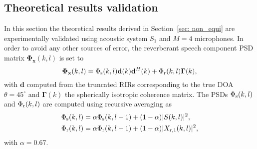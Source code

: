 \documentclass[10pt]{IEEEtran}
\begin{document}
\subsection{Theoretical results validation}
\label{sec: theo_validation}
In this section the theoretical results derived in Section~\ref{sec: non_equi} are experimentally validated using acoustic system $S_1$ and $M = 4$ microphones.
In order to avoid any other sources of error, the reverberant speech component PSD matrix $\mathbf{\Phi}_{\mathbf{x}}(k,l)$ is set to
\begin{equation}
\mathbf{\Phi}_{\mathbf{x}}(k,l) = \Phi_{\rm s}(k,l)\mathbf{d}(k)\mathbf{d}^H(k) + \Phi_{\rm r}(k,l)\mathbf{\Gamma}(k),
\end{equation}
with $\mathbf{d}$ computed from the truncated RIRs corresponding to the true DOA $\theta = 45^{\circ}$ and $\mathbf{\Gamma}(k)$ the spherically isotropic coherence matrix.
The PSDs $\Phi_{\rm s}(k,l)$ and $\Phi_{\rm r}(k,l)$ are computed using recursive averaging as
\begin{align}
\Phi_{\rm s}(k,l) &= \alpha \Phi_{\rm s}(k,l-1) + (1-\alpha)|S(k,l)|^2, \\
\label{eq: phir_true}
\Phi_{\rm r}(k,l) &= \alpha \Phi_{\rm r}(k,l-1) + (1-\alpha)|X_{{\rm r},1}(k,l)|^2,
\end{align}
with $\alpha = 0.67$.
\end{document}
